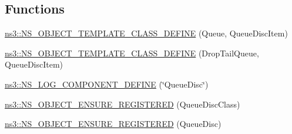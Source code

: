 \subsection*{Functions}
\begin{DoxyCompactItemize}
\item 
\hyperlink{namespacens3_acb3f12128fde9b31d6f69b2a1b5b8ec1}{ns3\+::\+N\+S\+\_\+\+O\+B\+J\+E\+C\+T\+\_\+\+T\+E\+M\+P\+L\+A\+T\+E\+\_\+\+C\+L\+A\+S\+S\+\_\+\+D\+E\+F\+I\+NE} (Queue, Queue\+Disc\+Item)
\item 
\hyperlink{namespacens3_acafa58bc698ac424e384fdb3b9797186}{ns3\+::\+N\+S\+\_\+\+O\+B\+J\+E\+C\+T\+\_\+\+T\+E\+M\+P\+L\+A\+T\+E\+\_\+\+C\+L\+A\+S\+S\+\_\+\+D\+E\+F\+I\+NE} (Drop\+Tail\+Queue, Queue\+Disc\+Item)
\item 
\hyperlink{namespacens3_a106a5020ec087819ea4705d80ff62580}{ns3\+::\+N\+S\+\_\+\+L\+O\+G\+\_\+\+C\+O\+M\+P\+O\+N\+E\+N\+T\+\_\+\+D\+E\+F\+I\+NE} (\char`\"{}Queue\+Disc\char`\"{})
\item 
\hyperlink{namespacens3_a0cfbef44a96fe967f5500129eaab22f1}{ns3\+::\+N\+S\+\_\+\+O\+B\+J\+E\+C\+T\+\_\+\+E\+N\+S\+U\+R\+E\+\_\+\+R\+E\+G\+I\+S\+T\+E\+R\+ED} (Queue\+Disc\+Class)
\item 
\hyperlink{namespacens3_ad63b7c4744d94e37a0c277e4253a1efa}{ns3\+::\+N\+S\+\_\+\+O\+B\+J\+E\+C\+T\+\_\+\+E\+N\+S\+U\+R\+E\+\_\+\+R\+E\+G\+I\+S\+T\+E\+R\+ED} (Queue\+Disc)
\end{DoxyCompactItemize}
